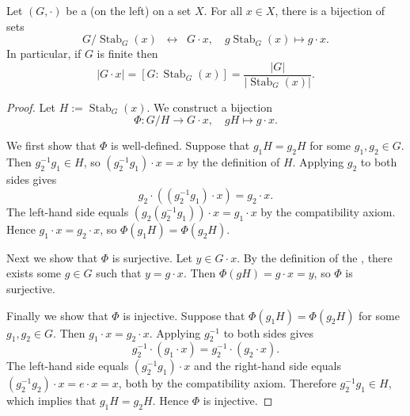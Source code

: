 \begin{proposition} \label{proposition:orbit_stabilizer_bijection_for_group_actions_on_sets}
    Let $(G,\cdot)$ be a   (on the left) on a set $X$.
    For all $x \in X$, there is a bijection of sets
    $$G / \operatorname{Stab}_G(x) \;\;\longleftrightarrow\;\; G \cdot x, \quad g \operatorname{Stab}_G(x) \mapsto g \cdot x.$$
    In particular, if $G$ is finite then
    $$|G \cdot x| = [G : \operatorname{Stab}_G(x)] = \frac{|G|}{|\operatorname{Stab}_G(x)|}.$$
\end{proposition}
\begin{proof}
    Let $H := \operatorname{Stab}_G(x)$. We construct a bijection
    $$\Phi : G / H \longrightarrow G \cdot x, \quad gH \mapsto g \cdot x.$$

    We first show that $\Phi$ is well-defined. Suppose that $g_1 H = g_2 H$ for some $g_1, g_2 \in G$. Then $g_2^{-1} g_1 \in H$, so $(g_2^{-1} g_1) \cdot x = x$ by the definition of $H$. Applying $g_2$ to both sides gives
    $$g_2 \cdot ((g_2^{-1} g_1) \cdot x) = g_2 \cdot x.$$
    The left-hand side equals $(g_2 (g_2^{-1} g_1)) \cdot x = g_1 \cdot x$ by the compatibility axiom. Hence $g_1 \cdot x = g_2 \cdot x$, so $\Phi(g_1 H) = \Phi(g_2 H)$.

    Next we show that $\Phi$ is surjective. Let $y \in G \cdot x$. By the definition of the , there exists some $g \in G$ such that $y = g \cdot x$. Then $\Phi(gH) = g \cdot x = y$, so $\Phi$ is surjective.

    Finally we show that $\Phi$ is injective. Suppose that $\Phi(g_1 H) = \Phi(g_2 H)$ for some $g_1, g_2 \in G$. Then $g_1 \cdot x = g_2 \cdot x$. Applying $g_2^{-1}$ to both sides gives
    $$g_2^{-1} \cdot (g_1 \cdot x) = g_2^{-1} \cdot (g_2 \cdot x).$$
    The left-hand side equals $(g_2^{-1} g_1) \cdot x$ and the right-hand side equals $(g_2^{-1} g_2) \cdot x = e \cdot x = x$, both by the compatibility axiom. Therefore $g_2^{-1} g_1 \in H$, which implies that $g_1 H = g_2 H$. Hence $\Phi$ is injective.


\end{proof}
